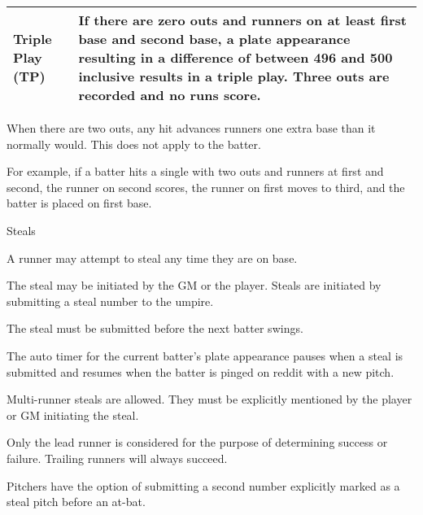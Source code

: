 \begin{deepEnumerate}
\begin{deepEnumerate}
\begin{center}
\begin{longtable}{|p{3cm}|p{8cm}|}
				\hline
				Triple Play (TP) & If there are zero outs and runners on at least first base and second base,                                                    
				a plate appearance resulting in a difference of between 496 and 500 inclusive results in a triple play. 
				Three outs are recorded and no runs score. \\
				\hline
			\end{longtable}
		\end{center}
		\item When there are two outs, any hit advances runners one extra base than it normally would. 
		This does not apply to the batter.
		\begin{deepEnumerate}
			\item For example, if a batter hits a single with two outs and runners at first and second, 
			the runner on second scores, the runner on first moves to third, and the batter is placed on first base.
		\end{deepEnumerate}
	\end{deepEnumerate}
	\item Steals
	\begin{deepEnumerate}
		\item A runner may attempt to steal any time they are on base.
		\begin{deepEnumerate}
			\item The steal may be initiated by the GM or the player. Steals are initiated by submitting a steal number to the umpire.
			\item The steal must be submitted before the next batter swings.
			\begin{deepEnumerate}
				\item The auto timer for the current batter's plate appearance pauses when a steal is submitted and resumes when the batter is pinged on reddit with a new pitch.
			\end{deepEnumerate}
			\item Multi-runner steals are allowed. They must be explicitly mentioned by the player or GM initiating the steal.
			\begin{deepEnumerate}
				\item Only the lead runner is considered for the purpose of determining success or failure. Trailing runners will always succeed.
			\end{deepEnumerate}
			\item Pitchers have the option of submitting a second number explicitly marked as a steal pitch before an at-bat. 

\end{deepEnumerate}
\end{deepEnumerate}
\end{deepEnumerate}
